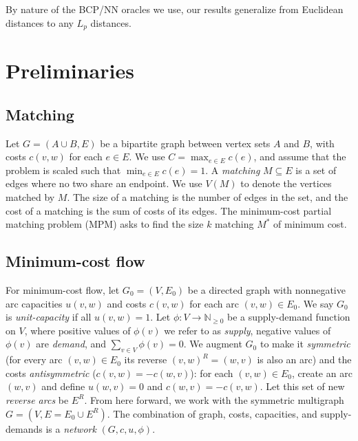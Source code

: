 \documentclass[11pt]{article}
\def\ints{\mathbb{N}}
\def\fsupply{\phi}
\theoremstyle{plain}
\begin{document}
By nature of the BCP/NN oracles we use, our results generalize from Euclidean 
distances to any $L_p$ distances.

\section{Preliminaries}
\label{section:prelim}

\subsection{Matching}

Let $G = (A \cup B, E)$ be a bipartite graph between vertex sets $A$ and $B$,
with costs $c(v, w)$ for each $e \in E$.
We use $C = \max_{e \in E} c(e)$, and assume that the problem is scaled such 
that $\min_{e \in E} c(e) = 1$.
A \emph{matching} $M \subseteq E$ is a set of edges where no two share an 
endpoint.
We use $V(M)$ to denote the vertices matched by $M$.
The size of a matching is the number of edges in the set, and the cost of a 
matching is the sum of costs of its edges.
The minimum-cost partial matching problem (MPM) asks to find the size $k$ 
matching $M^*$ of minimum cost.

\subsection{Minimum-cost flow}

For minimum-cost flow, let $G_0 = (V, E_0)$ be a directed graph with 
nonnegative arc capacities $u(v, w)$ and costs $c(v, w)$ for each arc 
$(v, w) \in E_0$. 
We say $G_0$ is \emph{unit-capacity} if all $u(v, w) = 1$.
Let $\fsupply: V \to \ints_{\geq 0}$ be a supply-demand function on $V$,
where positive values of $\fsupply(v)$ we refer to as \emph{supply},
negative values of $\fsupply(v)$ are \emph{demand}, and 
$\sum_{v \in V} \fsupply(v) = 0$.
We augment $G_0$ to make it \emph{symmetric} (for every arc $(v, w) \in E_0$ 
its reverse $(v, w)^R = (w, v)$ is also an arc) and the costs 
\emph{antisymmetric} ($c(v, w) = -c(w, v)$): for each $(v, w) \in E_0$, create 
an arc $(w, v)$ and define $u(w, v) = 0$ and $c(w, v) = -c(v, w)$.
Let this set of new \emph{reverse arcs} be $E^R$.
From here forward, we work with the symmetric multigraph 
$G = (V, E = E_0 \cup E^R)$.
The combination of graph, costs, capacities, and supply-demands is a 
\emph{network} $(G, c, u, \fsupply)$.
\end{document}
